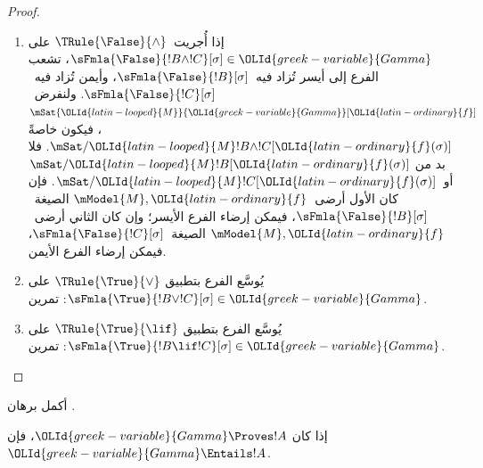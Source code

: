 \documentclass[../../../include/open-logic-section]{subfiles}
\begin{document}
\begin{proof}
\begin{enumerate}
\item إذا أُجريت~$\TRule{\False}{\land}$ على
  $\sFmla{\False}{!B \land !C}[\sigma] \in {\OLId{greek-variable}{Gamma}}$،
  تشعب الفرع إلى أيسر تُزاد فيه~$\sFmla{\False}{!B}[\sigma]$،
  وأيمن تُزاد فيه~$\sFmla{\False}{!C}[\sigma]$.
  ولنفرض~$\mSat{{\OLId{latin-looped}{M}}}{{\OLId{greek-variable}{Gamma}}}[{\OLId{latin-ordinary}{f}}]$، فيكون خاصةً
  $\mSat/{{\OLId{latin-looped}{M}}}{!B \land !C}[{\OLId{latin-ordinary}{f}}(\sigma)]$. فلا بد من
  $\mSat/{{\OLId{latin-looped}{M}}}{!B}[{\OLId{latin-ordinary}{f}}(\sigma)]$ أو~$\mSat/{{\OLId{latin-looped}{M}}}{!C}[{\OLId{latin-ordinary}{f}}(\sigma)]$.
  فإن كان الأول أرضى~$\mModel{M}, {\OLId{latin-ordinary}{f}}$
  الصيغة~$\sFmla{\False}{!B}[\sigma]$، فيمكن إرضاء الفرع الأيسر؛
  وإن كان الثاني أرضى~$\mModel{M}, {\OLId{latin-ordinary}{f}}$
  الصيغة~$\sFmla{\False}{!C}[\sigma]$، فيمكن إرضاء الفرع الأيمن.
\item يُوسَّع الفرع بتطبيق $\TRule{\True}{\lor}$ على
    $\sFmla{\True}{!B \lor !C}[\sigma] \in {\OLId{greek-variable}{Gamma}}$: تمرين.
\item يُوسَّع الفرع بتطبيق $\TRule{\True}{\lif}$ على
    $\sFmla{\True}{!B \lif !C}[\sigma] \in {\OLId{greek-variable}{Gamma}}$: تمرين.
\end{enumerate}
\end{proof}

\begin{prob}
أكمل برهان .
\end{prob}

\begin{cor}
إذا كان ${\OLId{greek-variable}{Gamma}} \Proves !A$، فإن ${\OLId{greek-variable}{Gamma}} \Entails !A$.
\end{cor}
\end{document}
